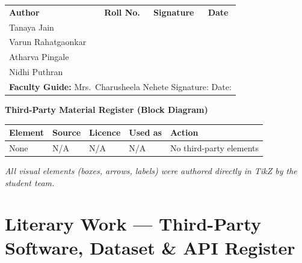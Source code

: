 ﻿\documentclass[conference]{IEEEtran}
\begin{document}
\vspace{10pt}
\noindent\begin{tabular}{@{}llll@{}}
\textbf{Author} & \textbf{Roll No.} & \textbf{Signature} & \textbf{Date}\\[5pt]
Tanaya Jain & & \underline{\hspace{3cm}} & \underline{\hspace{2cm}}\\[5pt]
Varun Rahatgaonkar & & \underline{\hspace{3cm}} & \underline{\hspace{2cm}}\\[5pt]
Atharva Pingale & & \underline{\hspace{3cm}} & \underline{\hspace{2cm}}\\[5pt]
Nidhi Puthran & & \underline{\hspace{3cm}} & \underline{\hspace{2cm}}\\[8pt]
\multicolumn{4}{l}{\textbf{Faculty Guide:} Mrs.\ Charusheela Nehete \quad
  Signature: \underline{\hspace{3cm}} \quad Date: \underline{\hspace{2cm}}}\\
\end{tabular}

\vspace{12pt}
\noindent\textbf{Third-Party Material Register (Block Diagram)}

\noindent\begin{tabular}{@{}lllll@{}}
\toprule
\textbf{Element} & \textbf{Source} & \textbf{Licence} & \textbf{Used as} & \textbf{Action}\\
\midrule
None & N/A & N/A & N/A & No third-party elements\\
\bottomrule
\end{tabular}

\noindent\textit{All visual elements (boxes, arrows, labels) were authored directly
in Ti\textit{k}Z by the student team.}

\section{Literary Work --- Third-Party Software, Dataset \& API Register}
\label{app:thirdparty}
\end{document}
